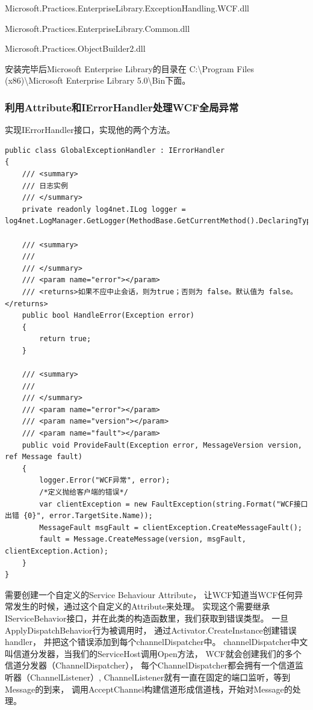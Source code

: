 \documentclass{book}
\begin{document}
Microsoft.Practices.EnterpriseLibrary.ExceptionHandling.WCF.dll

Microsoft.Practices.EnterpriseLibrary.Common.dll

Microsoft.Practices.ObjectBuilder2.dll

安装完毕后Microsoft Enterprise Library的目录在
C:\textbackslash Program Files (x86)\textbackslash Microsoft Enterprise Library 5.0\textbackslash Bin下面。

\subsubsection{利用Attribute和IErrorHandler处理WCF全局异常}

实现IErrorHandler接口，实现他的两个方法。

\begin{lstlisting}[language={[Sharp]C},caption=实现IErrorHandler接口]
public class GlobalExceptionHandler : IErrorHandler
{
    /// <summary>
    /// 日志实例
    /// </summary>
    private readonly log4net.ILog logger = log4net.LogManager.GetLogger(MethodBase.GetCurrentMethod().DeclaringType);

    /// <summary>
    /// 
    /// </summary>
    /// <param name="error"></param>
    /// <returns>如果不应中止会话，则为true；否则为 false。默认值为 false。</returns>
    public bool HandleError(Exception error)
    {
        return true;
    }

    /// <summary>
    /// 
    /// </summary>
    /// <param name="error"></param>
    /// <param name="version"></param>
    /// <param name="fault"></param>
    public void ProvideFault(Exception error, MessageVersion version, ref Message fault)
    {
        logger.Error("WCF异常", error);
        /*定义抛给客户端的错误*/
        var clientException = new FaultException(string.Format("WCF接口出错 {0}", error.TargetSite.Name));
        MessageFault msgFault = clientException.CreateMessageFault();
        fault = Message.CreateMessage(version, msgFault, clientException.Action); 
    }
}
\end{lstlisting}

需要创建一个自定义的Service Behaviour Attribute，
让WCF知道当WCF任何异常发生的时候，通过这个自定义的Attribute来处理。
实现这个需要继承IServiceBehavior接口，并在此类的构造函数里，我们获取到错误类型。
一旦ApplyDispatchBehavior行为被调用时，
通过Activator.CreateInstance创建错误handler，
并把这个错误添加到每个channelDispatcher中。
channelDispatcher中文叫信道分发器，当我们的ServiceHost调用Open方法，
WCF就会创建我们的多个信道分发器（ChannelDispatcher），
每个ChannelDispatcher都会拥有一个信道监听器（ChannelListener）,
ChannelListener就有一直在固定的端口监听，等到Message的到来，
调用AcceptChannel构建信道形成信道栈，开始对Message的处理。
\end{document}
